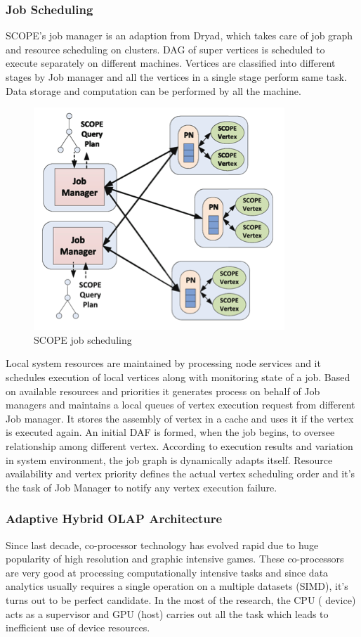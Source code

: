 \documentclass[runningheads,a4paper]{llncs}
\begin{document}
{\subsubsection{Job Scheduling}
SCOPE's job manager is an adaption from Dryad, which takes care of job graph and resource scheduling on clusters. DAG of super vertices is scheduled to execute separately on different machines. Vertices are classified into different stages by Job manager and all the vertices in a single stage perform same task.  Data storage and computation can be performed by all the machine.\\
\begin{figure}[!htb]
	\includegraphics[scale=1]{./images/krunal3}
	\centering
	\caption{SCOPE job scheduling }
	\label{fig:scope_job_sched}
\end{figure}
Local system resources are maintained by processing node services and it schedules execution of local vertices along with monitoring state of a job. Based on available resources and priorities it generates process on behalf of Job managers and maintains a local queues of vertex execution request from different Job manager. It stores the assembly of vertex in a cache and uses it if the vertex is executed again. An initial DAF is formed, when the job begins, to oversee relationship among different vertex. According to execution results and variation in system environment, the job graph is dynamically adapts itself. Resource availability and vertex priority defines the actual vertex scheduling order and it's the task of Job Manager to notify any vertex execution failure.\\

\subsubsection{Adaptive Hybrid OLAP Architecture}
Since last decade, co-processor technology has evolved rapid due to huge popularity of high resolution and graphic intensive games. These co-processors are very good at processing computationally intensive tasks and since data analytics usually requires a single operation on a multiple datasets (SIMD), it's turns out to be perfect candidate. In the most of the research, the CPU ( device) acts as a supervisor and GPU (host) carries out all the task which leads to inefficient use of device resources. \\

}
\end{document}

